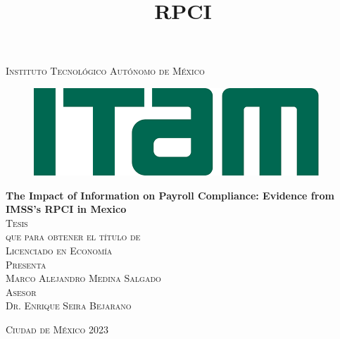 \documentclass[10pt, oneside]{book}
\begin{document}

\begin{titlepage}
\begin{center}

\title{RPCI}

\textsc{\Large Instituto Tecnológico Autónomo de México}\\[2em]

\begin{figure}[h]
\begin{center}
\includegraphics[scale=0.50]{04_Figures/itam_logo.png}
\end{center}
\end{figure}


\textbf{\LARGE The Impact of Information on Payroll Compliance: Evidence from IMSS's RPCI in Mexico}\\[2em]

\textsc{\large Tesis}\\[1em]

\textsc{\large que para obtener el título de}\\[1em]

\textsc{\LARGE Licenciado en Economía}\\[1em]

\textsc{\large Presenta}\\[1em]

\textsc{\LARGE Marco Alejandro Medina Salgado}\\[1em]

\textsc{\large Asesor}\\[1em]

\textsc{\LARGE Dr. Enrique Seira Bejarano}\\[2em]


\end{center}

\vspace*{\fill}
\textsc{Ciudad de México \hspace*{\fill} 2023}

\end{titlepage}
\end{document}
